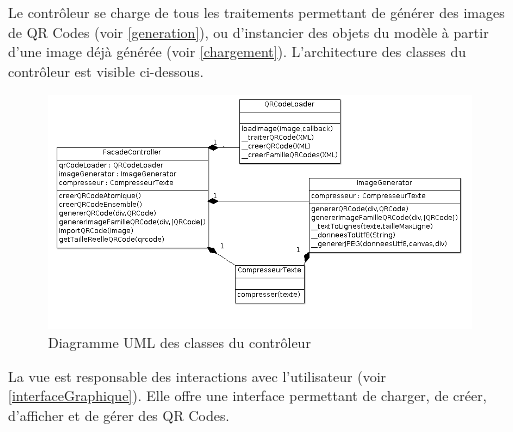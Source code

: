 \par
Le contrôleur se charge de tous les traitements permettant de générer des images de QR Codes (voir \ref{generation}), ou d'instancier des objets du modèle à partir d'une image déjà générée (voir \ref{chargement}). L'architecture des classes du contrôleur est visible ci-dessous.


\begin{figure}[!h]
	\centering
   \includegraphics[scale=0.4]{img/controllerUML.png}
   \caption{Diagramme UML des classes du contrôleur}
\end{figure}

\par
La vue est responsable des interactions avec l'utilisateur (voir \ref{interfaceGraphique}). Elle offre une interface permettant de charger, de créer, d'afficher et de gérer des QR Codes.